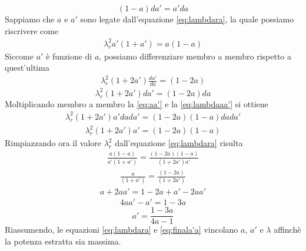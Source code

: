 \begin{equation}\label{eq:aa'}
\left(1 - a \right) da' = a' da
\end{equation}
Sappiamo che $a$ e $a'$ sono legate dall'equazione \ref{eq:lambdara}, la quale possiamo riscrivere come
\begin{align*}
\lambda_r^2 a' \left( 1+ a' \right) = a \left( 1 - a \right)
\end{align*}
Siccome $a'$ è funzione di $a$, possiamo differenziare membro a membro rispetto a quest'ultima
\begin{align*}
\lambda_r^2 \left( 1+ 2a' \right) \frac{da'}{da} = \left( 1 - 2a \right)
\end{align*}
\begin{equation}\label{eq:lambdaaa'}
\lambda_r^2 \left( 1+ 2a' \right) da' = \left( 1 - 2a \right)da
\end{equation}
Moltiplicando membro a membro la \ref{eq:aa'} e la \ref{eq:lambdaaa'} si ottiene
\begin{align*}
\lambda_r^2 \left( 1 + 2a' \right) a' da da' = \left( 1 - 2a \right) \left( 1-a \right) da da'
\end{align*}
\begin{align*}
\lambda_r^2 \left( 1 + 2a' \right) a' = \left( 1- 2a \right) \left(1 -a \right)
\end{align*}
Rimpiazzando ora il valore $\lambda_r^2$ dall'equazione \ref{eq:lambdara} risulta
\begin{align*}
\frac{a \left(1 - a \right)}{a' \left(1 + a' \right)} = \frac{\left( 1 - 2a \right) \left( 1 -a \right)}{\left(1 + 2a' \right) a'}
\end{align*}
\begin{align*}
\frac{a}{\left( 1 + a' \right)} = \frac{\left( 1 - 2a \right)}{\left( 1 + 2a' \right)}
\end{align*}
\begin{align*}
a + 2 a a' = 1 - 2a + a' - 2aa'
\end{align*}
\begin{align*}
4aa' -a' = 1 - 3a
\end{align*}
\begin{equation}\label{eq:finala'a}
a' = \frac{1 - 3a}{4a -1}
\end{equation}
Riassumendo, le equazioni \ref{eq:lambdara} e \ref{eq:finala'a} vincolano $a$, $a'$ e $\lambda$ affinchè la potenza estratta sia massima.


